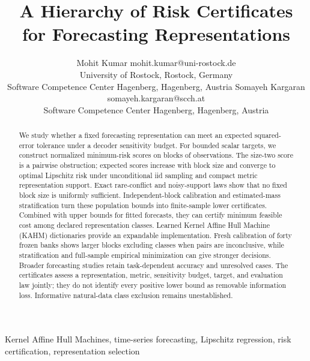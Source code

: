 \documentclass[twoside,11pt]{article}
\begin{document}

\title{A Hierarchy of Risk Certificates\\for Forecasting Representations}
\author{\name Mohit Kumar \email mohit.kumar@uni-rostock.de\\
\addr University of Rostock, Rostock, Germany\\
Software Competence Center Hagenberg, Hagenberg, Austria
\AND
\name Somayeh Kargaran \email somayeh.kargaran@scch.at\\
\addr Software Competence Center Hagenberg, Hagenberg, Austria}
\maketitle

\begin{abstract}
We study whether a fixed forecasting representation can meet an expected
squared-error tolerance under a decoder sensitivity budget. For bounded scalar
targets, we construct normalized minimum-risk scores on blocks of observations.
The size-two score is a pairwise obstruction; expected scores increase with
block size and converge to optimal Lipschitz risk under unconditional iid
sampling and compact metric representation support. Exact rare-conflict and
noisy-support laws show that no fixed block size is uniformly sufficient.
Independent-block calibration and estimated-mass stratification turn these
population bounds into finite-sample lower certificates. Combined with upper
bounds for fitted forecasts, they can certify minimum feasible cost among
declared representation classes. Learned Kernel Affine Hull Machine (KAHM)
dictionaries provide an expandable implementation. Fresh calibration of forty
frozen banks shows larger blocks excluding classes when pairs are inconclusive,
while stratification and full-sample empirical minimization can give stronger
decisions. Broader forecasting studies retain task-dependent accuracy and
unresolved cases. The certificates assess a representation, metric, sensitivity
budget, target, and evaluation law jointly; they do not identify every positive
lower bound as removable information loss. Informative natural-data class
exclusion remains unestablished.
\end{abstract}
\begin{keywords}
Kernel Affine Hull Machines, time-series forecasting, Lipschitz regression,
risk certification, representation selection
\end{keywords}













\end{document}
